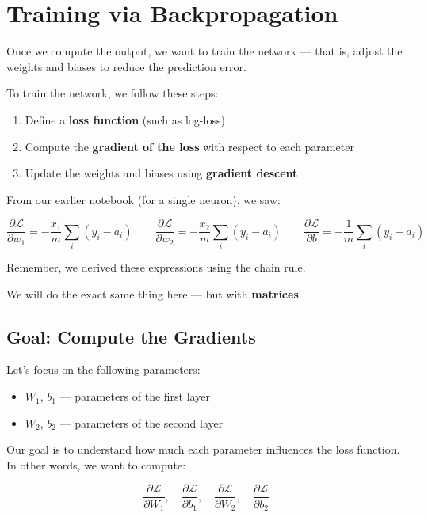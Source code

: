 \documentclass[11pt]{article}
\begin{document}
\section{Training via Backpropagation}

Once we compute the output, we want to train the network —  
that is, adjust the weights and biases to reduce the prediction error.

To train the network, we follow these steps:

\begin{enumerate}
    \item Define a \textbf{loss function} (such as log-loss)
    \item Compute the \textbf{gradient of the loss} with respect to each parameter
    \item Update the weights and biases using \textbf{gradient descent}
\end{enumerate}

From our earlier notebook (for a single neuron), we saw:

\[
\frac{\partial \mathcal{L}}{\partial w_1} = -\frac{x_1}{m} \sum_i (y_i - a_i)
\quad\quad
\frac{\partial \mathcal{L}}{\partial w_2} = -\frac{x_2}{m} \sum_i (y_i - a_i)
\quad\quad
\frac{\partial \mathcal{L}}{\partial b} = -\frac{1}{m} \sum_i (y_i - a_i)
\]

Remember, we derived these expressions using the chain rule.

\begin{actionbox}[title=Now We Scale Up]
We will do the exact same thing here — but with \textbf{matrices}.
\end{actionbox}

\subsection{Goal: Compute the Gradients}

Let’s focus on the following parameters:

\begin{itemize}
  \item $W_1$, $b_1$ — parameters of the first layer
  \item $W_2$, $b_2$ — parameters of the second layer
\end{itemize}

Our goal is to understand how much each parameter influences the loss function.  
In other words, we want to compute:

\[
\frac{\partial \mathcal{L}}{\partial W_1}, \quad
\frac{\partial \mathcal{L}}{\partial b_1}, \quad
\frac{\partial \mathcal{L}}{\partial W_2}, \quad
\frac{\partial \mathcal{L}}{\partial b_2}
\]
\end{document}
